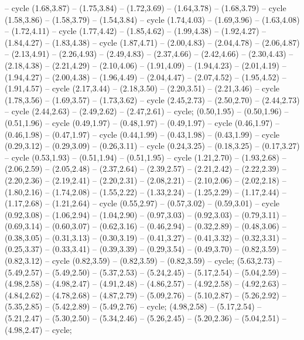 {-- cycle (1.68,3.87) -- (1.75,3.84) -- (1.72,3.69) -- (1.64,3.78) -- (1.68,3.79) -- cycle (1.58,3.86) -- (1.58,3.79) -- (1.54,3.84) -- cycle (1.74,4.03) -- (1.69,3.96) -- (1.63,4.08) -- (1.72,4.11) -- cycle (1.77,4.42) -- (1.85,4.62) -- (1.99,4.38) -- (1.92,4.27) -- (1.84,4.27) -- (1.83,4.38) -- cycle (1.87,4.71) -- (2.00,4.83) -- (2.04,4.78) -- (2.06,4.87) -- (2.13,4.91) -- (2.26,4.93) -- (2.49,4.83) -- (2.37,4.66) -- (2.42,4.66) -- (2.30,4.43) -- (2.18,4.38) -- (2.21,4.29) -- (2.10,4.06) -- (1.91,4.09) -- (1.94,4.23) -- (2.01,4.19) -- (1.94,4.27) -- (2.00,4.38) -- (1.96,4.49) -- (2.04,4.47) -- (2.07,4.52) -- (1.95,4.52) -- (1.91,4.57) -- cycle (2.17,3.44) -- (2.18,3.50) -- (2.20,3.51) -- (2.21,3.46) -- cycle (1.78,3.56) -- (1.69,3.57) -- (1.73,3.62) -- cycle (2.45,2.73) -- (2.50,2.70) -- (2.44,2.73) -- cycle (2.44,2.63) -- (2.49,2.62) -- (2.47,2.61) -- cycle;
 (0.50,1.95) -- (0.50,1.96) -- (0.51,1.96) -- cycle (0.49,1.97) -- (0.48,1.97) -- (0.49,1.97) -- cycle (0.46,1.97) -- (0.46,1.98) -- (0.47,1.97) -- cycle (0.44,1.99) -- (0.43,1.98) -- (0.43,1.99) -- cycle (0.29,3.12) -- (0.29,3.09) -- (0.26,3.11) -- cycle (0.24,3.25) -- (0.18,3.25) -- (0.17,3.27) -- cycle (0.53,1.93) -- (0.51,1.94) -- (0.51,1.95) -- cycle (1.21,2.70) -- (1.93,2.68) -- (2.06,2.59) -- (2.05,2.48) -- (2.37,2.64) -- (2.39,2.57) -- (2.21,2.42) -- (2.22,2.39) -- (2.20,2.36) -- (2.19,2.41) -- (2.20,2.31) -- (2.08,2.21) -- (2.10,2.06) -- (2.02,2.18) -- (1.80,2.16) -- (1.74,2.08) -- (1.55,2.22) -- (1.33,2.24) -- (1.25,2.29) -- (1.17,2.44) -- (1.17,2.68) -- (1.21,2.64) -- cycle (0.55,2.97) -- (0.57,3.02) -- (0.59,3.01) -- cycle (0.92,3.08) -- (1.06,2.94) -- (1.04,2.90) -- (0.97,3.03) -- (0.92,3.03) -- (0.79,3.11) -- (0.69,3.14) -- (0.60,3.07) -- (0.62,3.16) -- (0.46,2.94) -- (0.32,2.89) -- (0.48,3.06) -- (0.38,3.05) -- (0.31,3.13) -- (0.30,3.19) -- (0.41,3.27) -- (0.41,3.32) -- (0.32,3.31) -- (0.25,3.37) -- (0.33,3.41) -- (0.39,3.39) -- (0.29,3.54) -- (0.49,3.70) -- (0.82,3.59) -- (0.82,3.12) -- cycle (0.82,3.59) -- (0.82,3.59) -- (0.82,3.59) -- cycle;
 (5.63,2.73) -- (5.49,2.57) -- (5.49,2.50) -- (5.37,2.53) -- (5.24,2.45) -- (5.17,2.54) -- (5.04,2.59) -- (4.98,2.58) -- (4.98,2.47) -- (4.91,2.48) -- (4.86,2.57) -- (4.92,2.58) -- (4.92,2.63) -- (4.84,2.62) -- (4.78,2.68) -- (4.87,2.79) -- (5.09,2.76) -- (5.10,2.87) -- (5.26,2.92) -- (5.35,2.85) -- (5.42,2.89) -- (5.49,2.76) -- cycle;
 (4.98,2.58) -- (5.17,2.54) -- (5.21,2.47) -- (5.30,2.50) -- (5.34,2.46) -- (5.26,2.45) -- (5.20,2.36) -- (5.04,2.51) -- (4.98,2.47) -- cycle;
}
